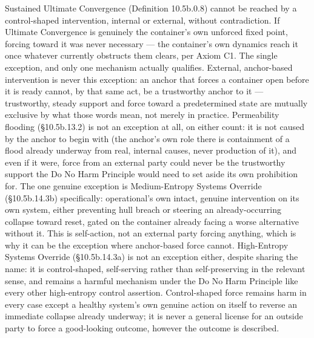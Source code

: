 \documentclass[
]{article}
\begin{document}
Sustained Ultimate Convergence (Definition 10.5b.0.8) cannot be reached
by a control-shaped intervention, internal or external, without
contradiction. If Ultimate Convergence is genuinely the container's own
unforced fixed point, forcing toward it was never necessary --- the
container's own dynamics reach it once whatever currently obstructs them
clears, per Axiom C1. The single exception, and only one mechanism
actually qualifies. External, anchor-based intervention is never this
exception: an anchor that forces a container open before it is ready
cannot, by that same act, be a trustworthy anchor to it --- trustworthy,
steady support and force toward a predetermined state are mutually
exclusive by what those words mean, not merely in practice. Permeability
flooding (§10.5b.13.2) is not an exception at all, on either count: it
is not caused by the anchor to begin with (the anchor's own role there
is containment of a flood already underway from real, internal causes,
never production of it), and even if it were, force from an external
party could never be the trustworthy support the Do No Harm Principle
would need to set aside its own prohibition for. The one genuine
exception is Medium-Entropy Systems Override (§10.5b.14.3b)
specifically: operational's own intact, genuine intervention on its own
system, either preventing hull breach or steering an already-occurring
collapse toward reset, gated on the container already facing a worse
alternative without it. This is self-action, not an external party
forcing anything, which is why it can be the exception where
anchor-based force cannot. High-Entropy Systems Override (§10.5b.14.3a)
is not an exception either, despite sharing the name: it is
control-shaped, self-serving rather than self-preserving in the relevant
sense, and remains a harmful mechanism under the Do No Harm Principle
like every other high-entropy control assertion. Control-shaped force
remains harm in every case except a healthy system's own genuine action
on itself to reverse an immediate collapse already underway; it is never
a general license for an outside party to force a good-looking outcome,
however the outcome is described.
\end{document}
